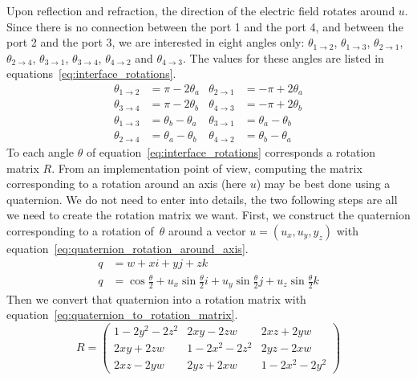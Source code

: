 Upon reflection and refraction, the direction of the electric field rotates around $u$.
Since there is no connection between the port 1 and the port 4, and between the port 2 and the port 3, we are interested in eight angles only: $\theta_{1 \rightarrow 2}$, $\theta_{1 \rightarrow 3}$, $\theta_{2 \rightarrow 1}$, $\theta_{2 \rightarrow 4}$, $\theta_{3 \rightarrow 1}$, $\theta_{3 \rightarrow 4}$, $\theta_{4 \rightarrow 2}$ and $\theta_{4 \rightarrow 3}$.
The values for these angles are listed in equations~\eqref{eq:interface_rotations}.
\begin{equation}
    \begin{aligned}
        \theta_{1 \rightarrow 2} &= \pi - 2\theta_a
        &
        \theta_{2 \rightarrow 1} &= -\pi + 2\theta_a
        \\
        \theta_{3 \rightarrow 4} &= \pi - 2\theta_b
        &
        \theta_{4 \rightarrow 3} &= -\pi + 2\theta_b
        \\
        \theta_{1 \rightarrow 3} &= \theta_b - \theta_a
        &
        \theta_{3 \rightarrow 1} &= \theta_a - \theta_b
        \\
        \theta_{2 \rightarrow 4} &= \theta_a - \theta_b
        &
        \theta_{4 \rightarrow 2} &= \theta_b - \theta_a
    \end{aligned}
    \label{eq:interface_rotations}
\end{equation}
To each angle $\theta$ of equation~\eqref{eq:interface_rotations} corresponds a rotation matrix $R$.
From an implementation point of view, computing the matrix corresponding to a rotation around an axis (here $u$) may be best done using a quaternion.
We do not need to enter into details, the two following steps are all we need to create the rotation matrix we want.
First, we construct the quaternion corresponding to a rotation of~$\theta$ around a vector $u=(u_x, u_y, y_z)$ with equation~\eqref{eq:quaternion_rotation_around_axis}.
\begin{equation}
    \begin{aligned}
        q &= w + xi + yj + zk
        \\
        q &= \cos \frac{\theta}{2}
           + u_x \sin \frac{\theta}{2} i
           + u_y \sin \frac{\theta}{2} j
           + u_z \sin \frac{\theta}{2} k
    \end{aligned}
    \label{eq:quaternion_rotation_around_axis}
\end{equation}
Then we convert that quaternion into a rotation matrix with equation~\eqref{eq:quaternion_to_rotation_matrix}.
\begin{equation}
    R =
    \begin{pmatrix}
        1 - 2y^2 - 2z^2   &   2xy - 2zw         &   2xz + 2yw \\
        2xy + 2zw         &   1 - 2x^2 - 2z^2   &   2yz - 2xw \\
        2xz - 2yw         &   2yz + 2xw         &   1 - 2x^2 - 2y^2
    \end{pmatrix}
    \label{eq:quaternion_to_rotation_matrix}
\end{equation}

